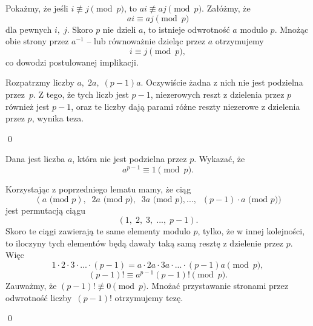 

\noindent
Pokażmy, że jeśli $i \not\equiv j \pmod{p}$, to $ai \not\equiv aj \pmod{p}$. 
Załóżmy, że 
\[
    ai \equiv aj \pmod{p}
\] 
dla pewnych $i,\; j$. Skoro $p$ nie dzieli $a$, to istnieje odwrotność $a$ modulo $p$. Mnożąc obie strony przez $a^{-1}$ -- lub równoważnie dzieląc przez $a$ otrzymujemy
\[
    i \equiv j \pmod{p},
\]
co dowodzi postulowanej implikacji.

\vspace{10px}
\noindent
Rozpatrzmy liczby $a, \; 2a,\; (p - 1)a$. Oczywiście żadna z nich nie jest podzielna przez~$p$. Z tego, że tych liczb jest $p - 1$, niezerowych reszt z dzielenia przez $p$ również jest $p - 1$, oraz te liczby dają parami różne reszty niezerowe z dzielenia przez $p$, wynika teza.

\qed


\newpage


\noindent
Dana jest liczba $a$, która nie jest podzielna przez $p$. Wykazać, że
\[
    a^{p - 1} \equiv 1 \pmod{p}.
\]


\noindent
Korzystając z poprzedniego lematu mamy, że ciąg
\[
    (a \text{ (mod } p),\;\; 2a \text{ (mod } p),\;\;  3a \text{ (mod } p), ...,\;\;  (p - 1) \cdot a \text{ (mod } p))
\]
jest permutacją ciągu
\[
 (1,\; 2,\; 3,\; ...,\; p - 1).
\]
Skoro te ciągi zawierają te same elementy modulo $p$, tylko, że w innej kolejności, to iloczyny tych elementów będą dawały taką samą resztę z dzielenie przez $p$. Więc
\[
    1 \cdot 2 \cdot 3 \cdot ... \cdot (p - 1) = a \cdot 2a \cdot 3a \cdot ... \cdot (p - 1)a \pmod{p},
\]
\[
    (p - 1)! \equiv a^{p - 1}(p - 1)! \pmod{p}.
\]
Zauważmy, że $(p - 1)! \not\equiv 0 \pmod{p}$. Mnożać przystawanie stronami przez odwrotność liczby~$(p - 1)!$ otrzymujemy tezę.

\qed

\vspace{10px}
